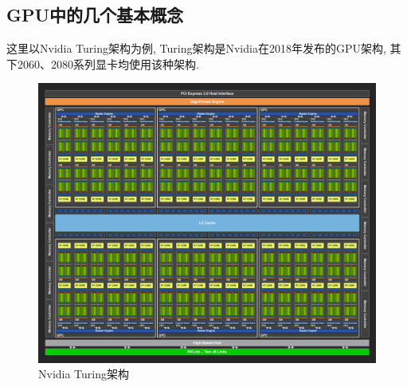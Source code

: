\documentclass[UTF8]{ctexart}
\begin{document}
\subsection{GPU中的几个基本概念}
这里以Nvidia Turing架构为例, Turing架构是Nvidia在2018年发布的GPU架构, 其下2060、2080系列显卡均使用该种架构.
\begin{figure}[H]
  \includegraphics[width=18cm]{nvidia_turing.png}
  \centering
  \caption{Nvidia Turing架构}
  \label{fig:nvidia_turing}
\end{figure}
\end{document}
